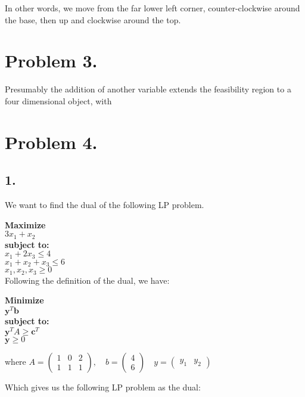 \documentclass[12pt]{report}
\begin{document}
In other words, we move from the far lower left corner, counter-clockwise around the base, then up and clockwise around the top.

\section*{Problem 3.}

Presumably the addition of another variable extends the feasibility region to a four dimensional object, with 

\section*{Problem 4.}

\subsection*{1.}

We want to find the dual of the following LP problem.

\textbf{Maximize}\\
  $3x_1 + x_2$\\
\textbf{subject to:}\\
  $ x_1 + 2x_3 \le 4 $ \\
  $ x_1 + x_2 + x_3\le 6 $ \\
  $ x_1,x_2,x_3 \ge 0 $ \\

Following the definition of the dual, we have:

\textbf{Minimize}\\
  $\textbf{y}^T \textbf{b} $\\
\textbf{subject to:}\\
  $ \textbf{y}^T A \ge \textbf{c}^T $ \\
  $ \textbf{y} \ge 0 $ 

where $A = \left(
\begin{matrix}
  1 & 0 & 2 \\
  1 & 1 & 1 
\end{matrix}
\right),
\quad 
b = \left(
\begin{matrix}
  4 \\
  6 
\end{matrix}
\right)
\quad 
y = \left(
\begin{matrix}
  y_1 & y_2  
\end{matrix}
\right) $ 

Which gives us the following LP problem as the dual:
\end{document}
